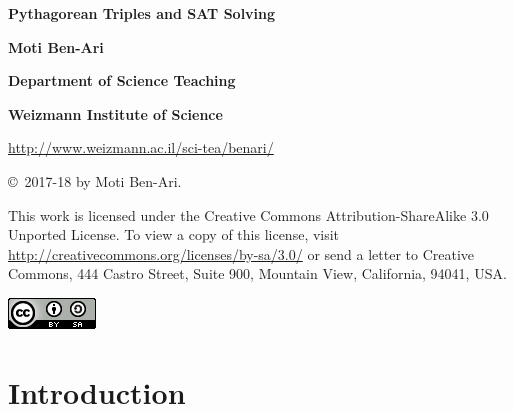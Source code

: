 \documentclass[11pt,a4paper]{article}
\begin{document}
\thispagestyle{empty}

\begin{center}

\textbf{\huge Pythagorean Triples and SAT Solving}

\bigskip
\bigskip
\bigskip

\textbf{\LARGE Moti Ben-Ari}

\bigskip

\textbf{\Large Department of Science Teaching}

\bigskip

\textbf{\Large Weizmann Institute of Science}

\bigskip

\url{http://www.weizmann.ac.il/sci-tea/benari/}

\end{center}

\bigskip
\bigskip

\begin{center}
\copyright{}\  2017-18 by Moti Ben-Ari.
\end{center}

\begin{footnotesize}
This work is licensed under the Creative Commons Attribution-ShareAlike 3.0 Unported License. To view a copy of this license, visit \url{http://creativecommons.org/licenses/by-sa/3.0/} or send a letter to Creative Commons, 444 Castro Street, Suite 900, Mountain View, California, 94041, USA.
\end{footnotesize}

\bigskip

\begin{center}
\includegraphics[width=.2\textwidth]{../by-sa.png}
\end{center}

\newpage



\section{Introduction}
\end{document}
